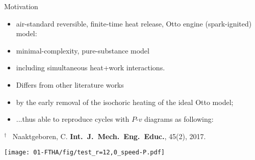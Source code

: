     \begin{frame}{Motivation}\vspace*{-2em}
        \vspace*\medskipamount
        \begin{itemize}
            \item<1->  \alert{air-standard reversible}, \alert{finite-time} heat release, Otto
                engine (spark-ignited) model:
            \item<1->  \alert{minimal-complexity}, \alert{pure-substance} model
            \item<1->  including \alert{simultaneous heat+work} interactions.
            \item<2->  \alert{Differs} from other literature works
            \item<2->  by the \alert{early removal} of the \alert{isochoric} heating of the
                ideal Otto model;
            \item<2->  ...thus able to reproduce cycles with \alert{$P$-$v$} diagrams as
                following:
        \end{itemize}\vspace*\bigskipamount
        {\footnotesize$^\dagger$~\color{Lgre}
        Naaktgeboren, C. \textbf{Int.~J.~Mech.~Eng.~Educ.}, 45(2), 2017.}
    \end{frame}

    \begin{frame}\vspace*{-2em}
        \begin{center}
            \noindent\hspace*{-4.5mm}%
            \texttt{[image: 01-FTHA/fig/test\_r=12,0\_speed-P.pdf]}
        \end{center}
    \end{frame}

